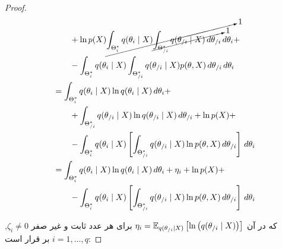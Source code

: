 \begin{proof}
\begin{align*}
		& \qquad + \ln  p ( X )  \cancelto{1}{\int_{\Theta_i^*}  q ( \theta_i \mid X ) 
			\cancelto{1}{\int_{\Theta_{/i}^*}  q ( \theta_{/i} \mid X )  \,d\theta_{/i}}
		\,d\theta_i} +																								\\
		& \qquad - \int_{\Theta_i^*}  q ( \theta_i \mid X ) 
			\int_{\Theta_{/i}^*}  q ( \theta_{/i} \mid X )   p ( \theta, X )  \,d\theta_{/i}
		\,d\theta_i																									\\
	&= \int_{\Theta_i^*}  q ( \theta_i \mid X )  \ln  q ( \theta_i \mid X )  \,d\theta_i +							\\
		& \qquad + \int_{\Theta_{/i}^*}  q ( \theta_{/i} \mid X )  \ln  q ( \theta_{/i} \mid X )  \,d\theta_{/i} +
			\ln  p ( X )  +																						\\
		& \qquad - \int_{\Theta_i^*}  q ( \theta_i \mid X )  \left[
			\int_{\Theta_{/i}^*}  q ( \theta_{/i} \mid X )  \ln  p ( \theta, X )  \,d\theta_{/i}
		\right] \,d\theta_i																							\\
	&= \int_{\Theta_i^*}  q ( \theta_i \mid X )  \ln  q ( \theta_i \mid X )  \,d\theta_i + \eta_i + \ln  p ( X )  +	\\
		& \qquad - \int_{\Theta_i^*}  q ( \theta_i \mid X )  \left[
			\int_{\Theta_{/i}^*}  q ( \theta_{/i} \mid X )  \ln  p ( \theta, X )  \,d\theta_{/i}
		\right] \,d\theta_i
\end{align*}


که در آن
$\eta_i =  \mathbb{E}_{ q ( \theta_{/i} \mid X ) } \left[ \ln \left(  q ( \theta_{/i} \mid X )  \right) \right] $
برای هر عدد ثابت و غیر صفر
$\zeta_i \neq 0$, \linebreak $i = 1, \dots, q$
بر قرار است:



\end{proof}
